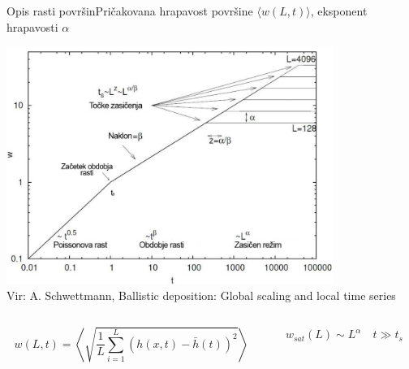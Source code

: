 \documentclass{beamer}
\begin{document}
\begin{frame}{Opis rasti površin}{Pričakovana hrapavost površine $\langle w(L,t) \rangle$, eksponent hrapavosti $\alpha$}
\begin{center}
  \footnotesize
  \includegraphics[width=0.8\textwidth]{slike/bdep3}
  \\ \tiny{Vir: A. Schwettmann, Ballistic deposition: Global scaling and local time series}
  \newline

\begin{columns}
  \begin{column}{0.6\textwidth}
    \begin{equation} w(L,t) = \left\langle \sqrt{\frac{1}{L} \sum_{i=1}^L (h(x,t)-\bar{h}(t))^2} \right\rangle \end{equation}
  \end{column}
  \begin{column}{0.4\textwidth}
    \begin{equation} \begin{array}{lr} w_{sat}(L) \sim L^\alpha & \ t \gg t_s \end{array} \end{equation}
  \end{column}
\end{columns}
\end{center}
\end{frame}
\end{document}
